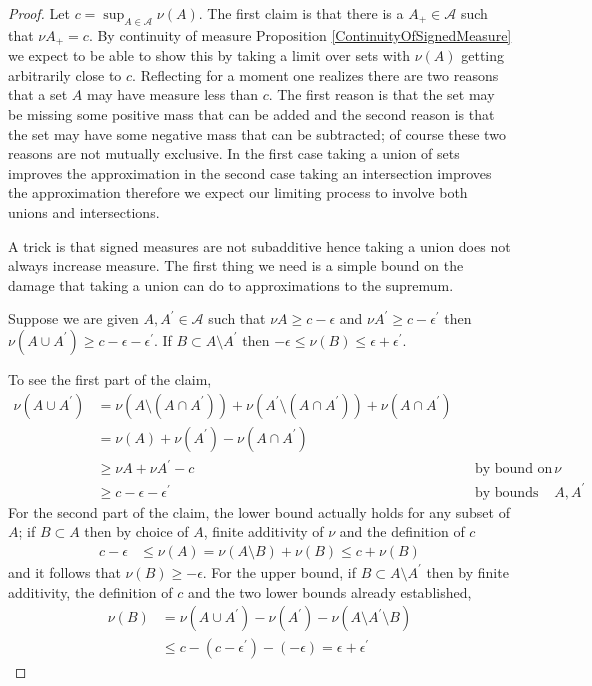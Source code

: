 \begin{proof}Let $c=\sup_{A \in \mathcal{A}} \nu(A)$.  The first claim
  is that there is a $A_+ \in \mathcal{A}$ such that $\nu A_+ = c$.
By continuity of measure Proposition \ref{ContinuityOfSignedMeasure} we expect to
be able to show this by taking a limit over sets with $\nu(A)$ getting arbitrarily close to $c$.  
Reflecting for a moment one realizes there are two reasons that a set $A$ may have measure less than 
$c$.  The first reason is that the set may be missing some positive mass that can be added and the second
reason is that the set may have some negative mass that can be subtracted; of course these two reasons are not 
mutually exclusive.  In the first case taking a union of sets improves the approximation in the second case taking an 
intersection improves the approximation therefore we expect our limiting process to involve both unions and intersections.

A trick is that signed measures are not subadditive hence taking a union does not always increase measure. 
The first thing we need is a simple bound on the damage that
taking a union can do to approximations to the supremum.
\begin{clm}Suppose we  are given $A,A^\prime \in \mathcal{A}$ such that $\nu A \geq c -
  \epsilon$ and $\nu A^\prime \geq c - \epsilon^\prime$ then $\nu(A \cup A^\prime) \geq c - \epsilon - \epsilon^\prime$.
 If $B \subset A \setminus A^\prime$ then $-\epsilon \leq \nu(B) \leq \epsilon + \epsilon^\prime$.
\end{clm}
To see the first part of the claim,
\begin{align*}
\nu (A \cup A^\prime) &= \nu (A \setminus (A \cap A^\prime)) + \nu (A^\prime  \setminus (A \cap A^\prime)) + \nu (A \cap A^\prime) \\
&=\nu (A) + \nu (A^\prime) - \nu (A \cap A^\prime) \\
&\geq \nu A + \nu A^\prime - c & &\text{by bound on $\nu$} \\
&\geq c - \epsilon - \epsilon^\prime & &\text{by bounds on $A,A^\prime$}
\end{align*}
For the second part of the claim, the lower bound actually holds for any subset of $A$; if $B \subset A$ then
by choice of $A$, finite additivity of $\nu$ and the definition of $c$
\begin{align*}
c  - \epsilon &\leq \nu(A) = \nu(A\setminus B) + \nu(B) \leq c + \nu(B)
\end{align*} 
and it follows that $\nu(B) \geq -\epsilon$.  
For the upper bound, if $B \subset A \setminus A^\prime$ then by finite additivity, the definition of $c$
and the two lower bounds already established,
\begin{align*}
\nu(B) &= \nu(A \cup A^\prime) - \nu(A^\prime) - \nu(A \setminus A^\prime \setminus B) \\
&\leq c - (c - \epsilon^\prime) - (-\epsilon) = \epsilon + \epsilon^\prime
\end{align*}


\end{proof}

